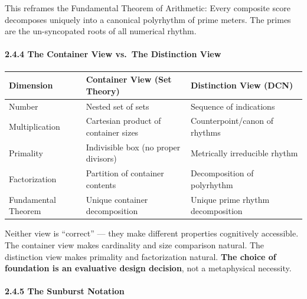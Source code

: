 \documentclass[
]{article}
\newcounter{none} %
\begin{document}
This reframes the Fundamental Theorem of Arithmetic: Every composite
score decomposes uniquely into a canonical polyrhythm of prime meters.
The primes are the un-syncopated roots of all numerical rhythm.

\paragraph{2.4.4 The Container View vs.~The Distinction
View}\label{the-container-view-vs.-the-distinction-view}

{\def\LTcaptype{none} %
\begin{longtable}[]{@{}
  >{\raggedright\arraybackslash}p{}
  >{\raggedright\arraybackslash}p{}
  >{\raggedright\arraybackslash}p{}@{}}
\toprule\noalign{}
\begin{minipage}[b]{\linewidth}\raggedright
Dimension
\end{minipage} & \begin{minipage}[b]{\linewidth}\raggedright
Container View (Set Theory)
\end{minipage} & \begin{minipage}[b]{\linewidth}\raggedright
Distinction View (DCN)
\end{minipage} \\
\midrule\noalign{}
\endhead
\bottomrule\noalign{}
\endlastfoot
Number & Nested set of sets & Sequence of indications \\
Multiplication & Cartesian product of container sizes &
Counterpoint/canon of rhythms \\
Primality & Indivisible box (no proper divisors) & Metrically
irreducible rhythm \\
Factorization & Partition of container contents & Decomposition of
polyrhythm \\
Fundamental Theorem & Unique container decomposition & Unique prime
rhythm decomposition \\
\end{longtable}
}

Neither view is ``correct'' --- they make different properties
cognitively accessible. The container view makes cardinality and size
comparison natural. The distinction view makes primality and
factorization natural. \textbf{The choice of foundation is an evaluative
design decision}, not a metaphysical necessity.

\paragraph{2.4.5 The Sunburst Notation}\label{the-sunburst-notation}
\end{document}
